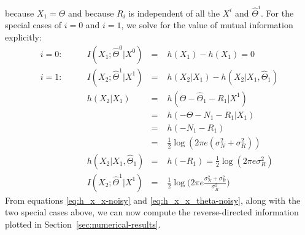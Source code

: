 \documentclass[conference]{IEEEtran}
\begin{document}
because $X_1 = \Theta$ and because $R_i$ is independent of all the $X^i$ and $\widehat\Theta^i$. For the special cases of $i=0$ and $i=1$, we solve for the value of mutual information explicitly:
\begin{align*}
	i = 0: & \qquad I(X_1; \widehat\Theta^0 | X^0) &=& \; h(X_1) - h(X_1) = 0 \\
	i = 1: & \qquad I(X_2; \widehat\Theta^1 | X^1) &=& \; h(X_2 | X_1) - h(X_2 | X_1, \widehat\Theta_1) \\
		   & \qquad h(X_2 | X_1)                   &=& \; h(\Theta - \widehat\Theta_1 - R_1 | X^1) \\
		   & \qquad                                &=& \; h(-\Theta - N_1 - R_1 | X_1) \\
		   & \qquad                                &=& \; h(-N_1 - R_1) \\
		   & \qquad                                &=& \; \frac{1}{2} \log(2 \pi e (\sigma_N^2 + \sigma_R^2)) \\
		   & \qquad h(X_2 | X_1, \widehat\Theta_1) &=& \; h(-R_1) = \frac{1}{2} \log(2 \pi e \sigma_R^2) \\
		   & \qquad I(X_2; \widehat\Theta^1 | X^1) &=& \; \frac{1}{2} \log \bigg( 2 \pi e \frac{\sigma_N^2 + \sigma_R^2}{\sigma_R^2} \bigg)
\end{align*}
From equations \eqref{eq:h_x_x-noisy} and \eqref{eq:h_x_x_theta-noisy}, along with the two special cases above, we can now compute the reverse-directed information plotted in Section~\ref{sec:numerical-results}.






%
%
%




\end{document}
